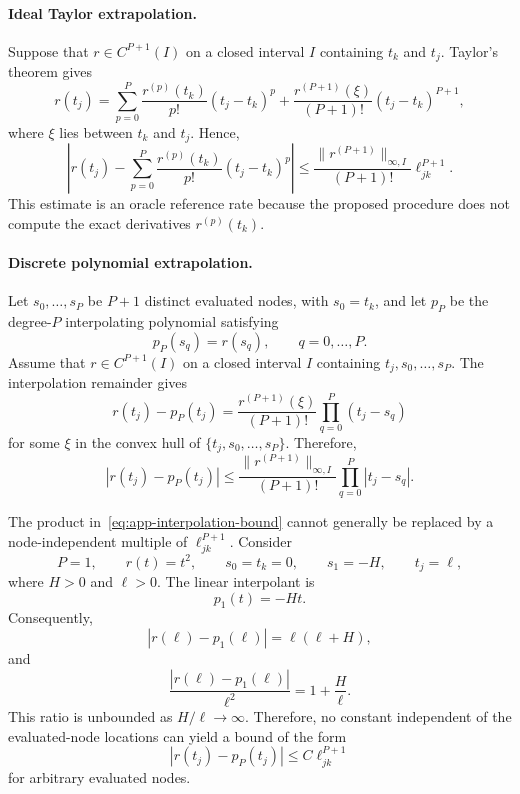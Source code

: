 \paragraph{Ideal Taylor extrapolation.}
Suppose that $r\in C^{P+1}(I)$ on a closed interval $I$ containing
$t_k$ and $t_j$. Taylor's theorem gives
\begin{equation}
r(t_j)
=
\sum_{p=0}^{P}
\frac{r^{(p)}(t_k)}{p!}
(t_j-t_k)^p
+
\frac{r^{(P+1)}(\xi)}{(P+1)!}
(t_j-t_k)^{P+1},
\label{eq:app-taylor-expansion}
\end{equation}
where $\xi$ lies between $t_k$ and $t_j$. Hence,
\begin{equation}
\left|
r(t_j)
-
\sum_{p=0}^{P}
\frac{r^{(p)}(t_k)}{p!}
(t_j-t_k)^p
\right|
\leq
\frac{
\|r^{(P+1)}\|_{\infty,I}
}{
(P+1)!
}
\ell_{jk}^{P+1}.
\label{eq:app-taylor-bound}
\end{equation}
This estimate is an oracle reference rate because the proposed
procedure does not compute the exact derivatives $r^{(p)}(t_k)$.

\paragraph{Discrete polynomial extrapolation.}
Let $s_0,\ldots,s_P$ be $P+1$ distinct evaluated nodes, with
$s_0=t_k$, and let $p_P$ be the degree-$P$ interpolating polynomial
satisfying
\[
p_P(s_q)=r(s_q),
\qquad
q=0,\ldots,P.
\]
Assume that $r\in C^{P+1}(I)$ on a closed interval $I$ containing
$t_j,s_0,\ldots,s_P$. The interpolation remainder gives
\begin{equation}
r(t_j)-p_P(t_j)
=
\frac{r^{(P+1)}(\xi)}{(P+1)!}
\prod_{q=0}^{P}(t_j-s_q)
\label{eq:app-interpolation-remainder}
\end{equation}
for some $\xi$ in the convex hull of
$\{t_j,s_0,\ldots,s_P\}$. Therefore,
\begin{equation}
|r(t_j)-p_P(t_j)|
\leq
\frac{
\|r^{(P+1)}\|_{\infty,I}
}{
(P+1)!
}
\prod_{q=0}^{P}|t_j-s_q|.
\label{eq:app-interpolation-bound}
\end{equation}

The product in~\eqref{eq:app-interpolation-bound} cannot generally be
replaced by a node-independent multiple of $\ell_{jk}^{P+1}$. Consider
\[
P=1,
\qquad
r(t)=t^2,
\qquad
s_0=t_k=0,
\qquad
s_1=-H,
\qquad
t_j=\ell,
\]
where $H>0$ and $\ell>0$. The linear interpolant is
\[
p_1(t)=-Ht.
\]
Consequently,
\begin{equation}
|r(\ell)-p_1(\ell)|
=
\ell(\ell+H),
\end{equation}
and
\begin{equation}
\frac{|r(\ell)-p_1(\ell)|}{\ell^2}
=
1+\frac{H}{\ell}.
\label{eq:app-counterexample-ratio}
\end{equation}
This ratio is unbounded as $H/\ell\to\infty$. Therefore, no constant
independent of the evaluated-node locations can yield a bound of the
form
\[
|r(t_j)-p_P(t_j)|
\leq
C\ell_{jk}^{P+1}
\]
for arbitrary evaluated nodes.

